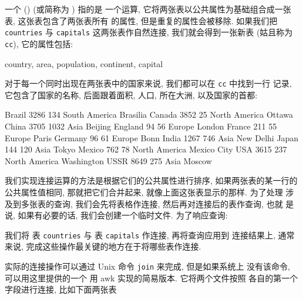 一个  () (或简称为 ) 指的是
一个运算, 它将两张表以公共属性为基础组合成一张表, 这张表包含了两张表所有
的属性, 但是重复的属性会被移除. 如果我们把 \verb'countries' 与
\verb'capitals' 这两张表作自然连接, 我们就会得到一张新表 (姑且称为
\verb'cc'), 它的属性包括:
\begin{awkcode}
    country, area, population, continent, capital
\end{awkcode}
对于每一个同时出现在两张表中的国家来说, 我们都可以在 \verb'cc' 中找到一行
记录, 它包含了国家的名称, 后面跟着面积, 人口, 所在大洲,
以及国家的首都:
\begin{awkcode}
    Brazil  3286    134     South America	Brasilia
    Canada  3852    25      North America	Ottawa
    China   3705    1032    Asia                Beijing
    England 94      56      Europe              London
    France  211     55      Europe              Paris
    Germany 96      61      Europe              Bonn
    India   1267    746     Asia                New Delhi
    Japan   144     120     Asia                Tokyo
    Mexico  762     78      North America	Mexico City
    USA     3615    237     North America	Washington
    USSR    8649    275     Asia                Moscow
\end{awkcode}

我们实现连接运算的方法是根据它们的公共属性进行排序, 如果两张表的某一行的
公共属性值相同, 那就把它们合并起来, 就像上面这张表显示的那样. 为了处理
涉及到多张表的查询, 我们会先将表格作连接, 然后再对连接后的表作查询, 也就
是说, 如果有必要的话, 我们会创建一个临时文件.
为了响应查询:
我们将 表 \verb'countries' 与 表 \verb'capitals'  作连接, 再将查询应用到
连接结果上, 通常来说, 完成这些操作最关键的地方在于将哪些表作连接.

实际的连接操作可以通过 Unix 命令 \texttt{join} 来完成, 但是如果系统上
没有该命令, 可以用这里提供的一个 用 awk 实现的简易版本. 它将两个文件按照
各自的第一个字段进行连接, 比如下面两张表

